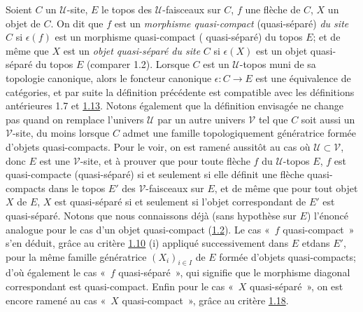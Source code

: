 Soient  $C$ un $𝒰$-site, $E$ le topos des $𝒰$-faisceaux
sur $C$, $f$ une flèche de $C$, $X$ un objet de $C$. On dit que $f$ est
un \emph{morphisme quasi-compact} (\resp quasi-séparé) \emph{du site}
$C$ si $\epsilon(f)$ est un morphisme quasi-compact (\resp
quasi-séparé) du topos $E$; et de même que $X$ est un \emph{objet
  quasi-séparé du site} $C$ si $\epsilon(X)$ est un
objet quasi-séparé du topos $E$ (comparer 1.2). Lorsque $C$ est un
$𝒰$-topos muni de sa topologie canonique, alors le foncteur
canonique $\epsilon : C \to E$ est une équivalence de catégories, et
par suite la définition précédente est compatible avec les
définitions antérieures 1.7 et \hyperref[VI.def1.13]{1.13}. Notons également
que la définition envisagée ne change pas quand on remplace
l'univers $𝒰$ par un autre univers $𝒱$ tel que $C$
soit aussi un $𝒱$-site, du moins lorsque $C$ admet une
famille topologiquement génératrice formée d'objets quasi-compacts.
Pour le voir, on est ramené aussitôt au cas où $𝒰
\subset 𝒱$, donc $E$ est une $𝒱$-site, et à prouver
que pour toute flèche $f$ du $𝒰$-topos $E$, $f$ est
quasi-compacte (\resp quasi-séparé) si et seulement si elle définit
une flèche quasi-compacts dans le topos $E'$ des
$𝒱$-faisceaux sur $E$, et de même que pour tout objet $X$ de
$E$, $X$ est quasi-séparé si et seulement si l'objet correspondant
de $E'$ est quasi-séparé. Notons que nous connaissons déjà (sans
hypothèse sur $E$) l'énoncé analogue pour le cas d'un objet
quasi-compact (\hyperref[VI.prop1.2]{1.2}). Le cas « $f$ quasi-compact »
s'en déduit, grâce au critère \hyperref[VI.prop1.10]{1.10} (i) appliqué
successivement dans $E$ et\pageoriginale dans $E'$, pour la même
famille génératrice $(X_i)_{i \in I}$ de $E$ formée d'objets
quasi-compacts; d'où également le cas « $f$ quasi-séparé »,
qui signifie que le morphisme diagonal correspondant est
quasi-compact. Enfin pour le cas « $X$ quasi-séparé », on est
encore ramené au cas « $X$ quasi-compact », grâce au critère
\hyperref[VI.cor1.18]{1.18}.

